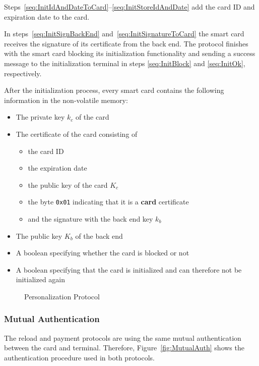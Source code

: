 \documentclass{article}
\begin{document}
Steps~\ref{seq:InitIdAndDateToCard}--\ref{seq:InitStoreIdAndDate} add the card ID and expiration date to the card.

In steps~\ref{seq:InitSignBackEnd} and~\ref{seq:InitSignatureToCard} the smart card receives the signature of its certificate from the back end.
The protocol finishes with the smart card blocking its initialization functionality and sending a success message to the initialization terminal in steps \ref{seq:InitBlock} and \ref{seq:InitOk}, respectively.

After the initialization process, every smart card contains the following information in the non-volatile memory:
\begin{itemize}
    \item The private key $k_c$ of the card
    \item The certificate of the card consisting of
    \begin{itemize}
        \item the card ID
        \item the expiration date
        \item the public key of the card $K_c$
        \item the byte \texttt{0x01} indicating that it is a \textbf{card} certificate
        \item and the signature with the back end key $k_b$
    \end{itemize}
    \item The public key $K_b$ of the back end
    \item A boolean specifying whether the card is blocked or not
    \item A boolean specifying that the card is initialized and can therefore not be initialized again
\end{itemize}

 \begin{figure}[ht]
     \centering
     
     \caption{Personalization Protocol}
     \label{fig:PersonProtocol}
 \end{figure}

\subsubsection{Mutual Authentication} \label{sec:mutualAuth}
The reload and payment protocols are using the same mutual authentication between the card and terminal.
Therefore, Figure~\ref{fig:MutualAuth} shows the authentication procedure used in both protocols.
\end{document}
